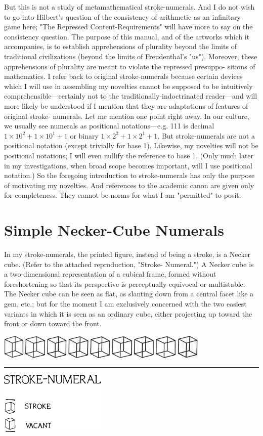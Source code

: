 But this is not a study of metamathematical stroke-numerals. And 
I do not wish to go into Hilbert's question of the consistency of 
arithmetic as an infinitary game here; "The Repressed Content-Requirements" 
will have more to say on the consistency question. The 
purpose of this manual, and of the artworks which it accompanies, is to 
establish apprehensions of plurality beyond the limits of traditional 
civilizations (beyond the limits of Freudenthal's "us"). Moreover, these 
apprehensions of plurality are meant to violate the repressed presuppo- 
sitions of mathematics. I refer back to original stroke-numerals because 
certain devices which I will use in assembling my novelties cannot be 
supposed to be intuitively comprehensible---certainly not to the 
traditionally-indoctrinated reader---and will more likely be understood 
if I mention that they are adaptations of features of original stroke- 
numerals. Let me mention one point right away. In our culture, we 
usually see numerals as positional notations---e.g. 111 is decimal 
$1\times 10^2+1\times 10^1+1$ or binary $1\times 2^2+1\times 2^1+1$. But stroke-numerals 
are not a positional notation (except trivially for base 1). Likewise, my 
novelties will not be positional notations; I will even nullify the 
reference to base 1. (Only much later in my investigations, when broad 
scope becomes important, will I use positional notation.) So the 
foregoing introduction to stroke-numerals has only the purpose of 
motivating my novelties. And references to the academic canon are given 
only for completeness. They cannot be norms for what I am "permitted" to posit. 

\section{Simple Necker-Cube Numerals}

In my stroke-numerals, the printed figure, instead of being a 
stroke, is a Necker cube. (Refer to the attached reproduction, "Stroke- 
Numeral.") A Necker cube is a two-dimensional representation of a 
cubical frame, formed without foreshortening so that its perspective is 
perceptually equivocal or multistable. The Necker cube can be seen as 
flat, as slanting down from a central facet like a gem, etc.; but for the 
moment I am exclusively concerned with the two easiest variants in 
which it is seen as an ordinary cube, either projecting up toward the 
front or down toward the front. 

{\center\includegraphics[width=4in]{img/neckercube}\plainbreak{2}
\includegraphics[width=2in]{img/neckerkey}\par}

